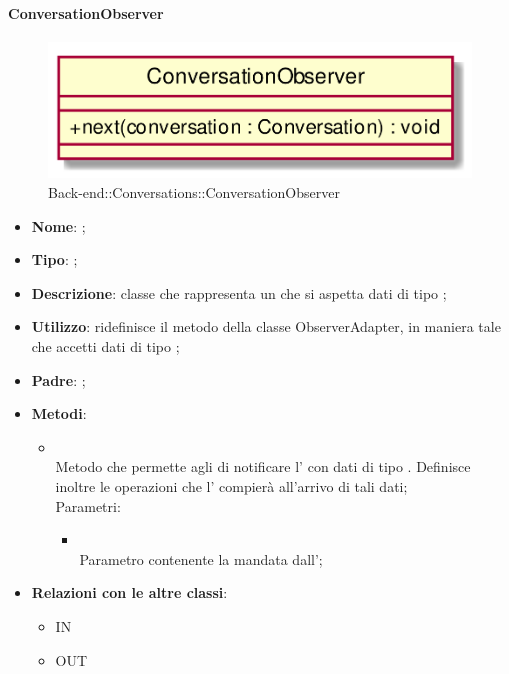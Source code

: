\hypertarget{ConversationObserver_label}{\paragraph{ConversationObserver}}
\begin{figure}[h]
	\centering
	\includegraphics[width=\textwidth,height=\textheight,keepaspectratio]{images/ClassConversationObserver.png}
	\caption{Back-end::Conversations::ConversationObserver}
\end{figure}
\begin{itemize}
	\item \textbf{Nome}: ;
	\item \textbf{Tipo}: ;
	\item \textbf{Descrizione}: classe che rappresenta un  che si aspetta dati di tipo ;
	\item \textbf{Utilizzo}: ridefinisce il metodo  della classe ObserverAdapter, in maniera tale che accetti dati di tipo ;
	\item \textbf{Padre}: ;
	\item \textbf{Metodi}:
	\begin{itemize}
		\item[]  \\
		Metodo che permette agli  di notificare l' con dati di tipo . Definisce inoltre le operazioni che l' compierà all'arrivo di tali dati;\\
		Parametri:
		\begin{itemize}
			\item {} \\
			Parametro contenente la  mandata dall';
		\end{itemize}
	\end{itemize}
	\item \textbf{Relazioni con le altre classi}:
	\begin{itemize}
		\item IN \hyperlink{ConversationObservable_label}{}
		\item OUT \hyperlink{Conversation_label}{}
	\end{itemize}
\end{itemize}
\FloatBarrier

